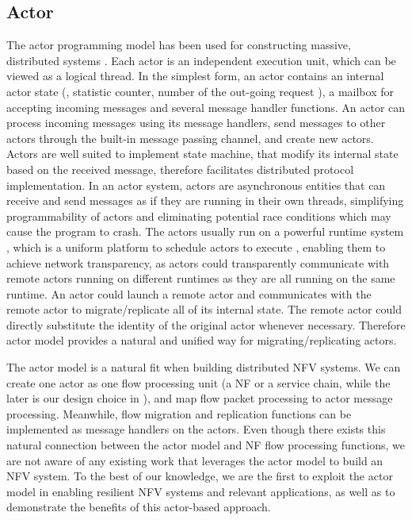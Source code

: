 \subsection{Actor}

The actor programming model has been used for constructing massive, distributed systems \cite{actor-wiki, akka, newell2016optimizing, AnalysisActor}. Each actor is an independent execution unit, which can be viewed as a logical thread. In the simplest form, an actor contains an internal actor state (\eg, statistic counter, \ac{number of the out-going request} %
), a mailbox for accepting incoming messages and several message handler functions. An actor can process incoming messages using its message handlers, send messages to other actors through the built-in message passing channel, and create new actors. \ac{Actors are well suited to implement state machine, that modify its internal state based on the received message, therefore facilitates distributed protocol implementation.} %
In an actor system, actors are asynchronous entities that can receive and send messages as if they are running \ac{in their own threads, simplifying programmability of actors and eliminating potential race conditions which may cause the program to crash.}
The actors usually run on a powerful runtime system \cite{erlang, akka, caf}, \ac{which is a uniform platform to schedule actors to execute}
, enabling them to achieve network transparency, \ac{as actors could transparently communicate with remote actors running on different runtimes as they are all running on the same runtime.}
\ac{An actor could launch a remote actor and communicates with the remote actor to migrate/replicate all of its internal state. The remote actor could directly substitute the identity of the original actor whenever necessary. Therefore actor model provides a natural and unified way for migrating/replicating actors.}

The actor model is a natural fit when building distributed NFV systems. We can create one actor as one flow processing unit (a NF or a service chain, while the later is our design choice in \nfactor), and map flow packet processing to actor message processing. Meanwhile, flow migration and replication functions can be implemented as message handlers on the actors. Even though there exists this natural connection between the actor model and NF flow processing functions, we are not aware of any existing work that leverages the actor model to build an NFV system. %
 To the best of our knowledge, we are the first to exploit the actor model in enabling resilient NFV systems and relevant applications, as well as to demonstrate the benefits of this actor-based approach.


